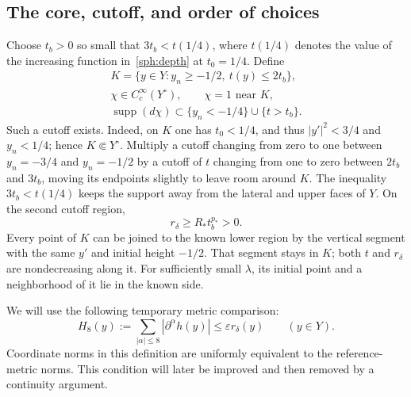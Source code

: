 \subsection{The core, cutoff, and order of choices}\label{sph:core-cutoff}

Choose $t_b>0$ so small that $3t_b<t(1/4)$, where $t(1/4)$ denotes
the value of the increasing function in~\eqref{sph:depth} at
$t_0=1/4$.  Define
\begin{equation}\label{sph:cutoff}
 \begin{gathered}
 K=\{y\in Y:y_n\ge-1/2,\ t(y)\le2t_b\},\\
 \chi\in C_c^\infty(Y^\circ),\qquad \chi=1\text{ near }K,\\
 \operatorname{supp}(d\chi)\subset
       \{y_n<-1/4\}\cup\{t>t_b\}.
 \end{gathered}
\end{equation}
Such a cutoff exists.  Indeed, on $K$ one has $t_0<1/4$, and thus
$|y'|^2<3/4$ and $y_n<1/4$; hence $K\Subset Y^\circ$.
Multiply a cutoff changing from zero to one between $y_n=-3/4$
and $y_n=-1/2$ by a cutoff of $t$ changing from one to zero between
$2t_b$ and $3t_b$, moving its endpoints slightly to leave room around
$K$.  The inequality $3t_b<t(1/4)$ keeps the support away from the
lateral and upper faces of $Y$.  On the second cutoff region,
\begin{equation}\label{sph:positive-depth-radius}
 r_\delta\ge R_*t_b^{p_*}>0.
\end{equation}
Every point of $K$ can be joined to the known lower region by the
vertical segment with the same $y'$ and initial height $-1/2$.
That segment stays in $K$; both $t$ and $r_\delta$ are nondecreasing
along it.  For sufficiently small $\lambda$, its initial point and a
neighborhood of it lie in the known side.

We will use the following temporary metric comparison:
\begin{equation}\label{sph:smallness}
 H_8(y):=\sum_{|\alpha|\le8}|\partial^\alpha h(y)|
       \le\varepsilon r_\delta(y)\qquad(y\in Y).
\end{equation}
Coordinate norms in this definition are uniformly equivalent to the
reference-metric norms.  This condition will later be improved and
then removed by a continuity argument.

